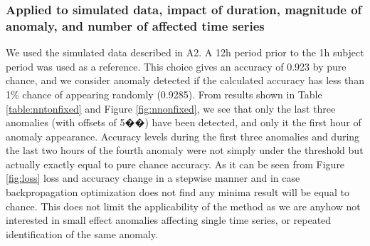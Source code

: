 \documentclass[5p]{elsarticle}
\begin{document}
\subsubsection{Applied to simulated data, impact of duration, magnitude of anomaly, and number of affected time series}
We used the simulated data described in A2. A 12h period prior to the 1h subject period was used as a reference. This choice gives an accuracy of 0.923 by pure chance, and we consider anomaly detected if the calculated accuracy has less than 1\% chance of appearing randomly (0.9285). From results shown in Table \ref{table:nntonfixed} and Figure \ref{fig:nnonfixed}, we see that only the last three anomalies (with offsets of 5��) have been detected, and only it the first hour of anomaly appearance. Accuracy levels during the first three anomalies and during the last two hours of the fourth anomaly were not simply under the threshold but actually exactly equal to pure chance accuracy. As it can be seen from Figure \ref{fig:loss} loss and accuracy change in a stepwise manner and in case backpropagation optimization does not find any minima result will be equal to chance. This does not limit the applicability of the method as we are anyhow not interested in small effect anomalies affecting single time series, or repeated identification of the same anomaly. 
\end{document}
